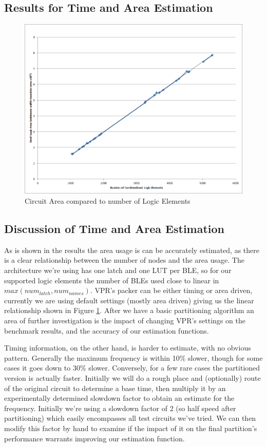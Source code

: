 \documentclass[12pt,drafta4paper,oneside]{memoir} %
\begin{document}
\subsection{Results for Time and Area Estimation}
\begin{figure}
    \includegraphics[width=\textwidth]{images/area-v-elements.png}
    \caption{Circuit Area compared to number of Logic Elements}
    \label{AreaVElements}
\end{figure}
\subsection{Discussion of Time and Area Estimation}
As is shown in the results  the area usage is can be accurately estimated, as there is a clear relationship between the number of nodes and the area usage. The architecture we're using  has one latch and one \ac{LUT} per \ac{BLE}, so for our supported logic elements the number of \acp{BLE} used close to linear in $max(num_{latch}, num_{names})$. \ac{VPR}'s packer can be either timing or area driven, currently we are using default settings (mostly area driven) giving us the linear relationship shown in Figure \ref{AreaVElements}. After we have a basic partitioning algorithm an area of further investigation is the impact of changing \ac{VPR}'s settings on the benchmark results, and the accuracy of our estimation functions.

Timing information, on the other hand, is harder to estimate, with no obvious pattern. Generally the maximum frequency is within 10\% slower, though for some cases it goes down to 30\% slower. Conversely, for a few rare cases the partitioned version is actually faster. Initially we will do a rough place and (optionally) route of the original circuit to determine a base time, then multiply it by an experimentally determined slowdown factor to obtain an estimate for the frequency. Initially we're using a slowdown factor of 2 (so half speed after partitioning) which easily encompasses all test circuits we've tried. We can then modify this factor by hand to examine if the impact of it on the final partition's performance warrants improving our estimation function.
\end{document}
